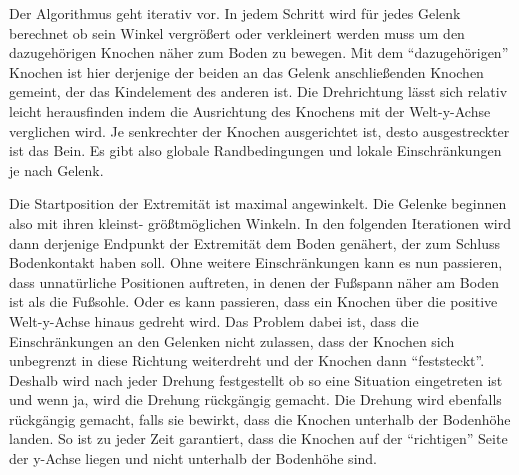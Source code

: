 %  
% 

Der Algorithmus geht iterativ vor.
In jedem Schritt wird für jedes Gelenk berechnet ob sein Winkel vergrößert oder verkleinert werden muss um den dazugehörigen Knochen näher zum Boden zu bewegen.
Mit dem "`dazugehörigen"' Knochen ist hier derjenige der beiden an das Gelenk anschließenden Knochen gemeint, der das Kindelement des anderen ist.
Die Drehrichtung lässt sich relativ leicht herausfinden indem die Ausrichtung des Knochens mit der Welt-y-Achse verglichen wird. Je senkrechter der Knochen ausgerichtet ist, desto ausgestreckter ist das Bein.
Es gibt also globale Randbedingungen und lokale Einschränkungen je nach Gelenk. %

Die Startposition der Extremität ist maximal angewinkelt. Die Gelenke beginnen also mit ihren kleinst- \bzw größtmöglichen Winkeln. In den folgenden Iterationen wird dann derjenige Endpunkt der Extremität dem Boden genähert, der zum Schluss Bodenkontakt haben soll. 
Ohne weitere Einschränkungen kann es nun passieren, dass unnatürliche Positionen auftreten, in denen \zb der Fußspann näher am Boden ist als die Fußsohle.
Oder es kann passieren, dass ein Knochen über die positive Welt-y-Achse hinaus gedreht wird. Das Problem dabei ist, dass die Einschränkungen an den Gelenken nicht zulassen, dass der Knochen sich unbegrenzt in diese Richtung weiterdreht und der Knochen dann "`feststeckt"'. Deshalb wird nach jeder Drehung festgestellt ob so eine Situation eingetreten ist und wenn ja, wird die Drehung rückgängig gemacht.
Die Drehung wird ebenfalls rückgängig gemacht, falls sie bewirkt, dass die Knochen unterhalb der Bodenhöhe landen.
So ist zu jeder Zeit garantiert, dass die Knochen auf der "`richtigen"' Seite der y-Achse liegen und nicht unterhalb der Bodenhöhe sind. %

